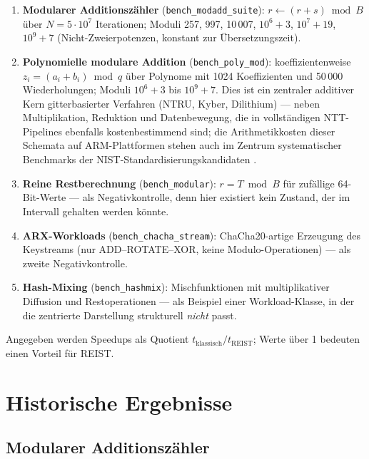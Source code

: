 \documentclass[11pt,a4paper]{scrartcl}
\theoremstyle{definition}
\theoremstyle{plain}
\theoremstyle{remark}
\begin{document}
\begin{enumerate}
\item \textbf{Modularer Additionszähler} (\texttt{bench\_modadd\_suite}): $r \leftarrow (r + s) \bmod B$ über $N = 5 \cdot 10^7$ Iterationen; Moduli 257, 997, 10\,007, $10^6{+}3$, $10^7{+}19$, $10^9{+}7$ (Nicht-Zweierpotenzen, konstant zur Übersetzungszeit).
\item \textbf{Polynomielle modulare Addition} (\texttt{bench\_poly\_mod}): koeffizientenweise $z_i = (a_i + b_i) \bmod q$ über Polynome mit 1024 Koeffizienten und 50\,000 Wiederholungen; Moduli $10^6{+}3$ bis $10^9{+}7$. Dies ist ein zentraler additiver Kern gitterbasierter Verfahren (NTRU, Kyber, Dilithium) --- neben Multiplikation, Reduktion und Datenbewegung, die in vollständigen NTT-Pipelines ebenfalls kostenbestimmend sind; die Arithmetikkosten dieser Schemata auf ARM-Plattformen stehen auch im Zentrum systematischer Benchmarks der NIST-Standardisierungskandidaten \cite{howe2022arm}.
\item \textbf{Reine Restberechnung} (\texttt{bench\_modular}): $r = T \bmod B$ für zufällige 64-Bit-Werte --- als Negativkontrolle, denn hier existiert kein Zustand, der im Intervall gehalten werden könnte.
\item \textbf{ARX-Workloads} (\texttt{bench\_chacha\_stream}): ChaCha20-artige Erzeugung des Keystreams \cite{chacha} (nur ADD--ROTATE--XOR, keine Modulo-Operationen) --- als zweite Negativkontrolle.
\item \textbf{Hash-Mixing} (\texttt{bench\_hashmix}): Mischfunktionen mit multiplikativer Diffusion und Restoperationen --- als Beispiel einer Workload-Klasse, in der die zentrierte Darstellung strukturell \emph{nicht} passt.
\end{enumerate}

Angegeben werden Speedups als Quotient $t_{\text{klassisch}} / t_{\text{REIST}}$; Werte über 1 bedeuten einen Vorteil für REIST.

\section{Historische Ergebnisse}
\label{sec:ergebnisse}

\subsection{Modularer Additionszähler}
\end{document}
